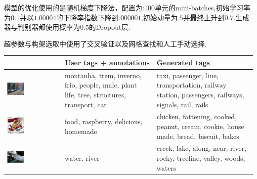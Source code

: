 \documentclass{article} %
\begin{document}
模型的优化使用的是随机梯度下降法，配置为:100单元的mini-batches,初始学习率为$0.1$并以$1.00004$的下降率指数下降到$.000001$,初始动量为$.5$并最终上升到$0.7$.生成器与判别器都使用概率为$0.5$的Dropout层.

超参数与构架选取中使用了交叉验证以及网格查找和人工手动选择.

\begin{table}[h]
\begin{tabular} {l | b{3.7cm} | b{3.7cm}}
  & User tags + annotations & Generated tags \\
 \hline
 \includegraphics[width=0.33\textwidth, height=0.12\textheight]{track.jpg} & montanha, trem, inverno, frio, people, male, plant life, tree, structures, transport, car & taxi, passenger, line, transportation, railway station, passengers, railways, signals, rail, rails \\
 \includegraphics[width=0.33\textwidth, height=0.12\textheight]{cake.jpg} & food, raspberry, delicious, homemade & chicken, fattening, cooked, peanut, cream, cookie, house made, bread, biscuit, bakes \\

 \includegraphics[width=0.33\textwidth, height=0.12\textheight]{river.jpg} & water, river & creek, lake, along, near, river, rocky, treeline, valley, woods, waters \\


\end{tabular}
\end{table}
\end{document}
